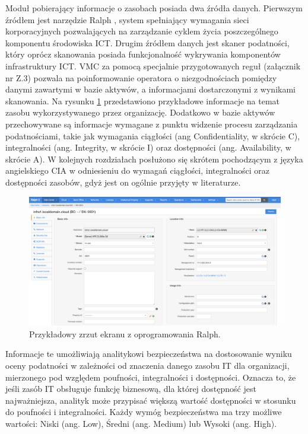 \bigbreak
Moduł pobierający informacje o zasobach posiada dwa źródła danych. Pierwszym źródłem jest narzędzie Ralph \cite{ralph}, system spełniający wymagania sieci korporacyjnych pozwalających na zarządzanie cyklem życia poszczególnego komponentu środowiska ICT. Drugim źródłem danych jest skaner podatności, który oprócz skanowania posiada funkcjonalność wykrywania komponentów infrastruktury ICT. VMC za pomocą specjalnie przygotowanych reguł (załącznik nr Z.3) pozwala na poinformowanie operatora o niezgodnościach pomiędzy danymi zawartymi w bazie aktywów, a informacjami dostarczonymi z wynikami skanowania. Na rysunku \ref{fig:chapter3:ralph-sample} przedstawiono przykładowe informacje na temat zasobu wykorzystywanego przez organizację. Dodatkowo w bazie aktywów przechowywane są informacje wymagane z punktu widzenie procesu zarządzania podatnościami, takie jak wymagania ciągłości (ang Confidentiality, w skrócie C), integralności (ang. Integrity, w skrócie I) oraz dostępności (ang. Availability, w skrócie A). W kolejnych rozdziałach posłużono się skrótem pochodzącym z języka angielskiego CIA w odniesieniu do wymagań ciągłości, integralności oraz dostępności zasobów, gdyż jest on ogólnie przyjęty w literaturze.


\begin{figure}[thb]
\centering
\includegraphics[width=\columnwidth]{Chapters/Rozwiazanie/vmc/ralph-sample.png}
\caption{Przykładowy zrzut ekranu z oprogramowania Ralph.}
\label{fig:chapter3:ralph-sample}
\end{figure}

\bigbreak
Informacje te umożliwiają analitykowi bezpieczeństwa na dostosowanie wyniku oceny podatności w zależności od znaczenia danego zasobu IT dla organizacji, mierzonego pod względem poufności, integralności i dostępności. Oznacza to, że jeśli zasób IT obsługuje funkcję biznesową, dla której dostępność jest najważniejsza, analityk może przypisać większą wartość dostępności w stosunku do poufności i integralności. Każdy wymóg bezpieczeństwa ma trzy możliwe wartości: Niski (ang. Low), Średni (ang. Medium) lub Wysoki (ang. High).

